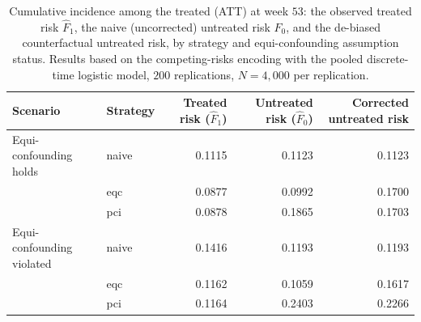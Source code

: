 \begin{table}
\centering
\begin{tabular}{llrrr}
\toprule
Scenario & Strategy & Treated risk ($\widehat{F}_1$) & Untreated risk ($\widehat{F}_0$) & Corrected untreated risk \\
\midrule
Equi-confounding holds & naive & 0.1115 & 0.1123 & 0.1123 \\
 & eqc & 0.0877 & 0.0992 & 0.1700 \\
 & pci & 0.0878 & 0.1865 & 0.1703 \\
Equi-confounding violated & naive & 0.1416 & 0.1193 & 0.1193 \\
 & eqc & 0.1162 & 0.1059 & 0.1617 \\
 & pci & 0.1164 & 0.2403 & 0.2266 \\
\bottomrule
\end{tabular}
\caption{Cumulative incidence among the treated (ATT) at week $53$: the observed treated risk $\widehat{F}_1$, the naive (uncorrected) untreated risk $\widehat{F}_0$, and the de-biased counterfactual untreated risk, by strategy and equi-confounding assumption status. Results based on the competing-risks encoding with the pooled discrete-time logistic model, $200$ replications, $N = 4{,}000$ per replication.}
\label{tab:unified_cif}
\end{table}
